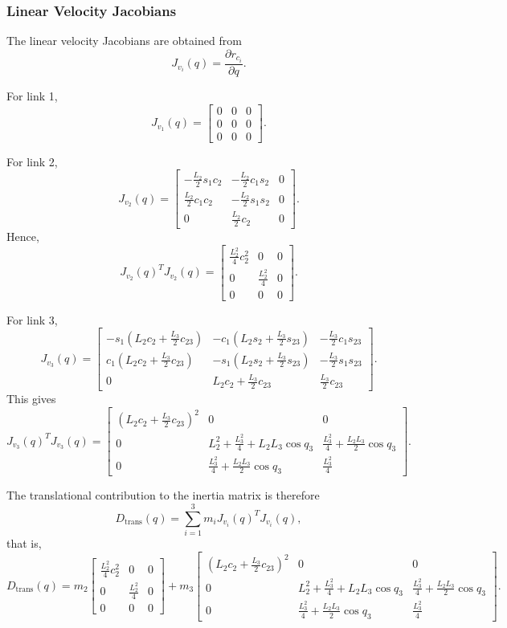 \documentclass{article}
\begin{document}
\subsubsection*{Linear Velocity Jacobians}

The linear velocity Jacobians are obtained from
\[
J_{v_i}(q)=\frac{\partial r_{c_i}}{\partial q}.
\]

For link 1,
\[
J_{v_1}(q)=
\begin{bmatrix}
0&0&0\\
0&0&0\\
0&0&0
\end{bmatrix}.
\]

For link 2,
\[
J_{v_2}(q)=
\begin{bmatrix}
-\frac{L_2}{2}s_1c_2 & -\frac{L_2}{2}c_1s_2 & 0\\
\frac{L_2}{2}c_1c_2 & -\frac{L_2}{2}s_1s_2 & 0\\
0 & \frac{L_2}{2}c_2 & 0
\end{bmatrix}.
\]
Hence,
\[
J_{v_2}(q)^T J_{v_2}(q)
=
\begin{bmatrix}
\frac{L_2^2}{4}c_2^2 & 0 & 0\\
0 & \frac{L_2^2}{4} & 0\\
0 & 0 & 0
\end{bmatrix}.
\]

For link 3,
\[
J_{v_3}(q)=
\begin{bmatrix}
- s_1\left(L_2c_2+\frac{L_3}{2}c_{23}\right) &
- c_1\left(L_2s_2+\frac{L_3}{2}s_{23}\right) &
-\frac{L_3}{2}c_1 s_{23}\\[4pt]
c_1\left(L_2c_2+\frac{L_3}{2}c_{23}\right) &
- s_1\left(L_2s_2+\frac{L_3}{2}s_{23}\right) &
-\frac{L_3}{2}s_1 s_{23}\\[4pt]
0 &
L_2c_2+\frac{L_3}{2}c_{23} &
\frac{L_3}{2}c_{23}
\end{bmatrix}.
\]
This gives
\[
J_{v_3}(q)^T J_{v_3}(q)
=
\begin{bmatrix}
\left(L_2c_2+\frac{L_3}{2}c_{23}\right)^2 & 0 & 0\\[6pt]
0 &
L_2^2+\frac{L_3^2}{4}+L_2L_3\cos q_3 &
\frac{L_3^2}{4}+\frac{L_2L_3}{2}\cos q_3\\[6pt]
0 &
\frac{L_3^2}{4}+\frac{L_2L_3}{2}\cos q_3 &
\frac{L_3^2}{4}
\end{bmatrix}.
\]

The translational contribution to the inertia matrix is therefore
\[
D_{\mathrm{trans}}(q)
=
\sum_{i=1}^{3} m_i J_{v_i}(q)^T J_{v_i}(q),
\]
that is,
\[
D_{\mathrm{trans}}(q)
=
m_2
\begin{bmatrix}
\frac{L_2^2}{4}c_2^2 & 0 & 0\\
0 & \frac{L_2^2}{4} & 0\\
0 & 0 & 0
\end{bmatrix}
+
m_3
\begin{bmatrix}
\left(L_2c_2+\frac{L_3}{2}c_{23}\right)^2 & 0 & 0\\
0 & L_2^2+\frac{L_3^2}{4}+L_2L_3\cos q_3 &
\frac{L_3^2}{4}+\frac{L_2L_3}{2}\cos q_3\\
0 & \frac{L_3^2}{4}+\frac{L_2L_3}{2}\cos q_3 &
\frac{L_3^2}{4}
\end{bmatrix}.
\]
\end{document}
